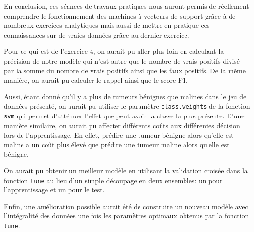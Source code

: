\documentclass{article}
\begin{document}
\begin{multicols}{2}
En conclusion, ces séances de travaux pratiques nous auront permis de réellement
comprendre le fonctionnement des machines à vecteurs de support grâce à de
nombreux exercices analytiques mais aussi de mettre en pratique ces
connaissances sur de vraies données grâce au dernier exercice.

Pour ce qui est de l'exercice 4, on aurait pu aller plus loin en calculant la
précision de notre modèle qui n'est autre que le nombre de vrais positifs
divisé par la somme du nombre de vrais positifs ainsi que les faux positifs.
De la même manière, on aurait pu calculer le rappel ainsi que le score F1.

Aussi, étant donné qu'il y a plus de tumeurs bénignes que malines dans le jeu
de données présenté, on aurait pu utiliser le paramètre \texttt{class.weights}
de la fonction \texttt{svm} qui permet d'atténuer l'effet que peut avoir la
classe la plus présente. D'une manière similaire, on aurait pu affecter
différents coûts aux différentes décision lors de l'apprentissage. En effet,
prédire une tumeur bénigne alors qu'elle est maline a un coût plus élevé que
prédire une tumeur maline alors qu'elle est bénigne.

On aurait pu obtenir un meilleur modèle en utilisant la validation croisée dans
la fonction \texttt{tune} au lieu d'un simple découpage en deux ensembles: un
pour l'apprentissage et un pour le test.

Enfin, une amélioration possible aurait été de construire un nouveau modèle
avec l'intégralité des données une fois les paramètres optimaux obtenus par la
fonction \texttt{tune}.


\end{multicols}
\end{document}
